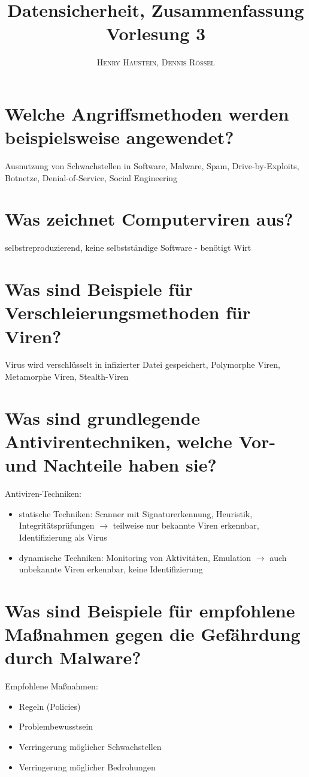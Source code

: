 \documentclass{article}
\title{\textbf{Datensicherheit, Zusammenfassung Vorlesung 3}}
\author{\textsc{Henry Haustein}, \textsc{Dennis Rössel}}
\date{}
\begin{document}
	\maketitle
	
	\section*{Welche Angriffsmethoden werden beispielsweise angewendet?}
	Ausnutzung von Schwachstellen in Software, Malware, Spam, Drive-by-Exploits, Botnetze, Denial-of-Service, Social Engineering
	
	\section*{Was zeichnet Computerviren aus?}
	selbstreproduzierend, keine selbstständige Software - benötigt Wirt

	\section*{Was sind Beispiele für Verschleierungsmethoden für Viren?}
	Virus wird verschlüsselt in infizierter Datei gespeichert, Polymorphe Viren, Metamorphe Viren, Stealth-Viren

	\section*{Was sind grundlegende Antivirentechniken, welche Vor- und Nachteile haben sie?}
	Antiviren-Techniken:
	\begin{itemize}
		\item statische Techniken: Scanner mit Signaturerkennung, Heuristik, Integritätsprüfungen $\to$ teilweise nur bekannte Viren erkennbar, Identifizierung als Virus
		\item dynamische Techniken: Monitoring von Aktivitäten, Emulation $\to$ auch unbekannte Viren erkennbar, keine Identifizierung
	\end{itemize}
	
	\section*{Was sind Beispiele für empfohlene Maßnahmen gegen die Gefährdung durch Malware?}
	Empfohlene Maßnahmen:
	\begin{itemize}
		\item Regeln (Policies)
		\item Problembewusstsein
		\item Verringerung möglicher Schwachstellen
		\item Verringerung möglicher Bedrohungen
	\end{itemize}
	
\end{document}
